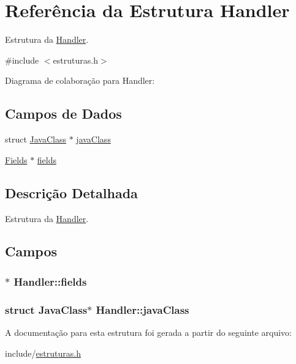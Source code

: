 \hypertarget{struct_handler}{}\section{Referência da Estrutura Handler}
\label{struct_handler}


Estrutura da \hyperlink{struct_handler}{Handler}.  




{\ttfamily \#include $<$estruturas.\+h$>$}



Diagrama de colaboração para Handler\+:
\subsection*{Campos de Dados}
\begin{DoxyCompactItemize}
\item 
struct \hyperlink{struct_java_class}{Java\+Class} $\ast$ \hyperlink{struct_handler_a0d23c9897e6fa7293405ac2ba8321efb}{java\+Class}
\item 
\hyperlink{struct_fields}{Fields} $\ast$ \hyperlink{struct_handler_ab880a8f45a9b1c69a21372e72f407028}{fields}
\end{DoxyCompactItemize}


\subsection{Descrição Detalhada}
Estrutura da \hyperlink{struct_handler}{Handler}. 

\subsection{Campos}
\subsubsection[{\texorpdfstring{fields}{fields}}]{$\ast$ Handler\+::fields}\hypertarget{struct_handler_ab880a8f45a9b1c69a21372e72f407028}{}\label{struct_handler_ab880a8f45a9b1c69a21372e72f407028}
\subsubsection[{\texorpdfstring{java\+Class}{javaClass}}]{\setlength{\rightskip}{0pt plus 5cm}struct {\bf Java\+Class}$\ast$ Handler\+::java\+Class}\hypertarget{struct_handler_a0d23c9897e6fa7293405ac2ba8321efb}{}\label{struct_handler_a0d23c9897e6fa7293405ac2ba8321efb}


A documentação para esta estrutura foi gerada a partir do seguinte arquivo\+:\begin{DoxyCompactItemize}
\item 
include/\hyperlink{estruturas_8h}{estruturas.\+h}\end{DoxyCompactItemize}
